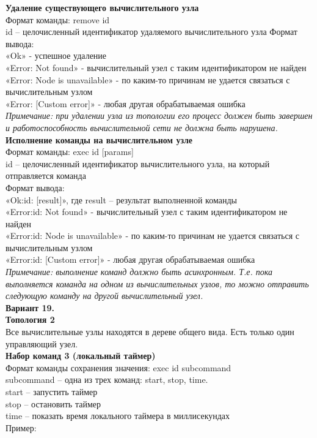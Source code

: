 \textbf{Удаление существующего вычислительного узла}\\
Формат команды: remove id\\
id – целочисленный идентификатор удаляемого вычислительного узла
Формат вывода:\\
«Ok» - успешное удаление\\
«Error: Not found» - вычислительный узел с таким идентификатором не найден\\
«Error: Node is unavailable» - по каким-то причинам не удается связаться с вычислительным узлом\\
«Error: [Custom error]» - любая другая обрабатываемая ошибка\\
\textit{Примечание: при удалении узла из топологии его процесс должен быть завершен и
работоспособность вычислительной сети не должна быть нарушена.
}\\

\textbf{Исполнение команды на вычислительном узле}\\
Формат команды: exec id [params]\\
id – целочисленный идентификатор вычислительного узла, на который отправляется команда\\
Формат вывода:\\
«Ok:id: [result]», где result – результат выполненной команды\\
«Error:id: Not found» - вычислительный узел с таким идентификатором не найден\\
«Error:id: Node is unavailable» - по каким-то причинам не удается связаться с вычислительным
узлом\\
«Error:id: [Custom error]» - любая другая обрабатываемая ошибка\\
\textit{Примечание: выполнение команд должно быть асинхронным. Т.е. пока выполняется команда на
одном из вычислительных узлов, то можно отправить следующую команду на другой
вычислительный узел.}\\

\textbf{Вариант 19.}\\ 
\textbf{Топология 2}\\
Все вычислительные узлы находятся в дереве общего вида. Есть только один управляющий узел. \\

\textbf{Набор команд 3 (локальный таймер)}\\
Формат команды сохранения значения: exec id subcommand\\
subcommand – одна из трех команд: start, stop, time.\\
start – запустить таймер\\
stop – остановить таймер\\
time – показать время локального таймера в миллисекундах\\
Пример:

